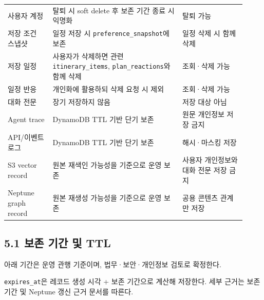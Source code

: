 \documentclass[12pt,a4paper]{article}
\newcommand{\DocNeedspace}[1]{\par\ifdim\dimexpr\pagegoal-\pagetotal\relax<#1\newpage\fi}
\begin{document}
\DocNeedspace{24\baselineskip}
\begin{small}
\begin{longtable}{@{}>{\centering\arraybackslash}m{0.176\linewidth}>{\RaggedRight\arraybackslash}m{0.499\linewidth}>{\centering\arraybackslash}m{0.245\linewidth}@{}}
\toprule
\multicolumn{1}{>{\centering\arraybackslash}m{0.176\linewidth}}{\textbf{데이터}} & \multicolumn{1}{>{\centering\arraybackslash}m{0.499\linewidth}}{\textbf{보존 정책}} & \multicolumn{1}{>{\centering\arraybackslash}m{0.245\linewidth}}{\textbf{사용자 통제}} \\
\midrule
\endhead
사용자 계정 & 탈퇴 시 soft delete 후 보존 기간 종료 시 \mbox{익명화} & 탈퇴 가능 \\
저장 조건 스냅샷 & 일정 저장 시 \texttt{preference\_\allowbreak{}snapshot}에 보존 & 일정 삭제 시 함께 삭제 \\
저장 일정 & 사용자가 삭제하면 관련 \texttt{itinerary\_\allowbreak{}items}, \texttt{plan\_\allowbreak{}reactions}와 함께 삭제 & 조회·삭제 가능 \\
일정 반응 & 개인화에 활용하되 삭제 요청 시 제외 & 조회·삭제 가능 \\
대화 전문 & 장기 저장하지 않음 & 저장 대상 아님 \\
Agent trace & DynamoDB TTL 기반 단기 보존 & 원문 개인정보 저장 금지 \\
API/이벤트 로그 & DynamoDB TTL 기반 단기 보존 & 해시·마스킹 저장 \\
S3 vector record & 원본 재색인 가능성을 기준으로 운영 보존 & 사용자 개인정보와 대화 전문 저장 금지 \\
Neptune graph record & 원본 재생성 가능성을 기준으로 운영 보존 & 공용 콘텐츠 관계만 저장 \\
\bottomrule
\end{longtable}
\end{small}


\newpage

\DocNeedspace{24\baselineskip}
\subsection*{5.1 보존 기간 및 TTL}


\DocNeedspace{3\baselineskip}
아래 기간은 운영 관행 기준이며, 법무·보안·개인정보 검토로 확정한다.

\DocNeedspace{3\baselineskip}
\texttt{expires\_\allowbreak{}at}은 레코드 생성 시각 + 보존 기간으로 계산해 저장한다. 세부 근거는\newline
보존 기간 및 Neptune 갱신 근거 문서를 따른다.
\end{document}
